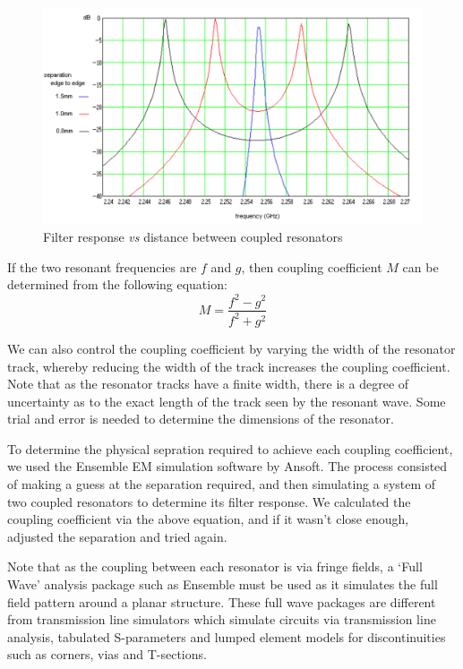 \begin{figure}
\begin{center}
\hspace{-5em}
\includegraphics[scale=0.6]{fig/design-resonant-frequency-splitting.pdf}
\end{center}
\caption{Filter response \emph{vs} distance between coupled resonators}
\label{figure:design-resonant-frequeny-splitting}
\end{figure}

If the two resonant frequencies are $f$ and $g$, then coupling coefficient $M$ can be determined from the following equation:
$$
M = 	\frac	{f^2 - g^2}
		{f^2 + g^2}
$$

We can also control the coupling coefficient by varying the width of the resonator track, whereby reducing the width of the track increases the coupling coefficient. Note that as the resonator tracks have a finite width, there is a degree of uncertainty as to the exact length of the track seen by the resonant wave. Some trial and error is needed to determine the dimensions of the resonator. 

To determine the physical sepration required to achieve each coupling coefficient, we used the Ensemble EM simulation software by Ansoft. The process consisted of making a guess at the separation required, and then simulating a system of two coupled resonators to determine its filter response. We calculated the coupling coefficient via the above equation, and if it wasn't close enough, adjusted the separation and tried again.

Note that as the coupling between each resonator is via fringe fields, a `Full Wave' analysis package such as Ensemble must be used as it simulates the full field pattern around a planar structure. These full wave packages are different from transmission line simulators which simulate circuits via transmission line analysis, tabulated S-parameters and lumped element models for discontinuities such as corners, vias and T-sections.

